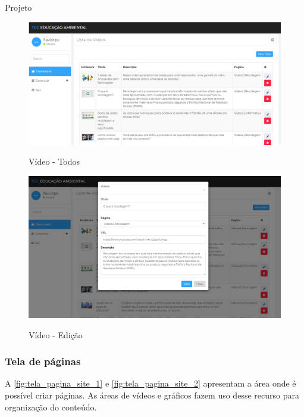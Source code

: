 \documentclass[
	12pt,				%
	openany,			%
	twoside,			%
	a4paper,			%
	english,			%
	french,				%
	spanish,			%
	brazil				%
	]{abntex2}
\begin{document}
\begin{chapter}{Projeto}
\begin{figure}[h]
\centering
   \caption{Vídeo - Todos}
   \includegraphics[scale=0.40]{media/tela_video_site_1.png}
     \label{fig:tela_video_site_1}
\end{figure}

\begin{figure}[h]
\centering
   \caption{Vídeo - Edição}
   \includegraphics[scale=0.40]{media/tela_video_site_2.png}
     \label{fig:tela_video_site_2}
\end{figure}

\newpage
\subsubsection{Tela de páginas} \label{tela_paginas}
 A \autoref{fig:tela_pagina_site_1} e \autoref{fig:tela_pagina_site_2} apresentam a área onde é possível criar páginas. As áreas de vídeos e gráficos fazem uso desse recurso para organização do conteúdo.


\end{chapter}
\end{document}
